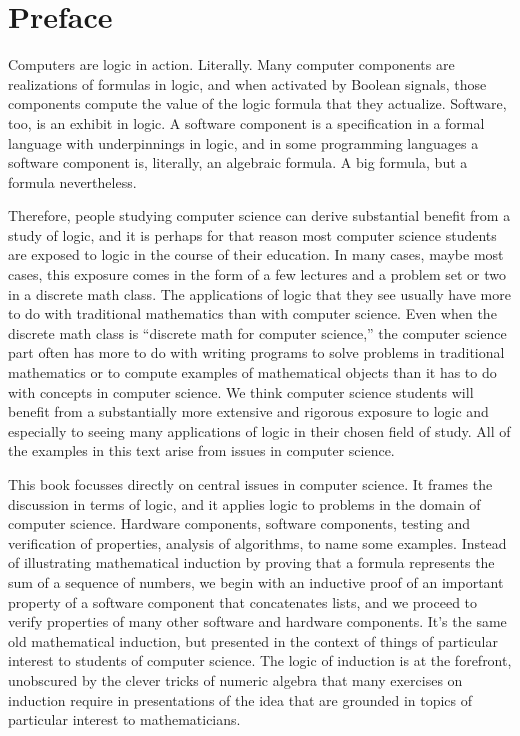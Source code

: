 \chapter{Preface}
\label{ch:Preface}

Computers are logic in action. Literally.
Many computer components are realizations of formulas in logic,
and when activated by Boolean signals, those components
compute the value of the logic formula that they actualize.
Software, too, is an exhibit in logic.
A software component is a specification in a formal language
with underpinnings in logic,
and in some programming languages a software component
is, literally, an algebraic formula.
A big formula, but a formula nevertheless.

Therefore, people studying computer science
can derive substantial benefit from a study of logic,
and it is perhaps for that reason most computer science students
are exposed to logic in the course of their education.
In many cases, maybe most cases, this exposure comes
in the form of a few lectures and a problem set or two
in a discrete math class. The applications of logic that
they see usually have more to do with traditional mathematics
than with computer science. Even when the discrete math class
is ``discrete math for computer science,'' the computer science
part often has more to do with writing programs to solve problems
in traditional mathematics or to compute examples of
mathematical objects than it has to do with
concepts in computer science.
We think computer science students will
benefit from a substantially more extensive and rigorous
exposure to logic and especially to seeing many applications of
logic in their chosen field of study.
All of the examples in this text arise from issues in computer science.

This book focusses directly on central issues
in computer science.
It frames the discussion in terms of logic,
and it applies logic to problems in the domain of computer science.
Hardware components, software components,
testing and verification of properties, analysis of algorithms,
to name some examples.
Instead of illustrating mathematical induction by  proving
that a formula represents the sum of a sequence of numbers,
we begin with an inductive proof of an important property of
a software component that concatenates lists,
and we proceed to verify properties of
many other software and hardware components.
It's the same old mathematical induction, but presented
in the context of things of particular interest to
students of computer science.
The logic of induction is at the forefront,
unobscured by the clever tricks of numeric algebra
that many exercises on induction require in
presentations of the idea that are grounded in topics
of particular interest to mathematicians.

